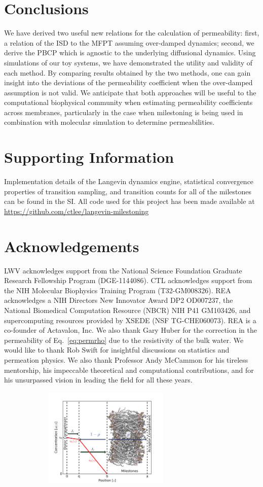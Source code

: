     \clearpage{}\section*{Conclusions}
    \par We have derived two useful new relations for the calculation of permeability: first, a relation of the ISD to the MFPT assuming over-damped dynamics; second, we derive the PBCP which is agnostic to the underlying diffusional dynamics. Using simulations of our toy systems, we have demonstrated the utility and validity of each method. By comparing results obtained by the two methods, one can gain insight into the deviations of the permeability coefficient when the over-damped assumption is not valid. We anticipate that both approaches will be useful to the computational biophysical community when estimating permeability coefficients across membranes, particularly in the case when milestoning is being used in combination with molecular simulation to determine permeabilities.
\clearpage{}

    \section*{Supporting Information}
        \par Implementation details of the Langevin dynamics engine, statistical convergence properties of transition sampling, and transition counts for all of the milestones can be found in the SI. All code used for this project has been made available at \url{https://github.com/ctlee/langevin-milestoning}

    \section*{Acknowledgements}
        \par LWV acknowledges support from the National Science Foundation Graduate Research Fellowship Program (DGE-1144086). CTL acknowledges support from the NIH Molecular Biophysics Training Program (T32-GM008326). REA acknowledges a NIH Directors New Innovator Award DP2 OD007237, the National Biomedical Computation Resource (NBCR) NIH P41 GM103426, and supercomputing resources provided by XSEDE (NSF TG-CHE060073).  REA is a co-founder of Actavalon, Inc. We also thank Gary Huber for the correction in the permeability of Eq.~\ref{eq:permrho} due to the resistivity of the bulk water. We would like to thank Rob Swift for insightful discussions on statistics and permeation physics. We also thank Professor Andy McCammon for his tireless mentorship, his impeccable theoretical and computational contributions, and for his unsurpassed vision in leading the field for all these years.

        \newpage
    \begin{figure}[htbp]
        \begin{center}
            \includegraphics[width=8.5cm,height=4.75cm,keepaspectratio]{Figures/probplot}
           \end{center}
      \end{figure}
